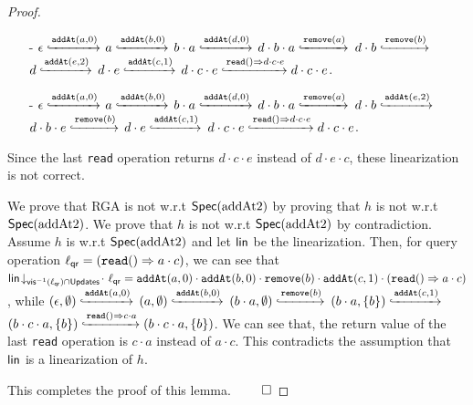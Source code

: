 \begin {proof}
\begin{itemize}
\item[-] $\epsilon \specarrow{\alabelshort[\mathtt{addAt}]{a,0}}$ $a \specarrow{\alabelshort[\mathtt{addAt}]{b,0}}$ $b \cdot a \specarrow{\alabelshort[\mathtt{addAt}]{d,0}}$ $d \cdot b \cdot a \specarrow{\alabelshort[\mathtt{remove}]{a}}$ $d \cdot b \specarrow{\alabelshort[\mathtt{remove}]{b}}$ $d \specarrow{\alabelshort[\mathtt{addAt}]{e,2}}$ $d \cdot e \specarrow{\alabelshort[\mathtt{addAt}]{c,1}}$ $d \cdot c \cdot e \specarrow{\alabellong[\mathtt{read}]{}{d \cdot c \cdot e}{}} d \cdot c \cdot e$. 

\item[-] $\epsilon \specarrow{\alabelshort[\mathtt{addAt}]{a,0}}$ $a \specarrow{\alabelshort[\mathtt{addAt}]{b,0}}$ $b \cdot a \specarrow{\alabelshort[\mathtt{addAt}]{d,0}}$ $d \cdot b \cdot a \specarrow{\alabelshort[\mathtt{remove}]{a}}$ $d \cdot b \specarrow{\alabelshort[\mathtt{addAt}]{e,2}}$ $d \cdot b \cdot e \specarrow{\alabelshort[\mathtt{remove}]{b}}$ $d \cdot e \specarrow{\alabelshort[\mathtt{addAt}]{c,1}}$ $d \cdot c \cdot e \specarrow{\alabellong[\mathtt{read}]{}{d \cdot c \cdot e}{}} d \cdot c \cdot e$.
\end{itemize} 

Since the last {\tt read} operation returns $d \cdot c \cdot e$ instead of $d \cdot e \cdot c$, these linearization is not correct. 

We prove that RGA is not \crdtlinearizable{} w.r.t $\specAddatTwo$ by proving that $h$ is not \crdtlinearizable{} w.r.t $\specAddatTwo$. We prove that $h$ is not \crdtlinearizable{} w.r.t $\specAddatTwo$ by contradiction. Assume $h$ is \crdtlinearizable{} w.r.t $\specAddatTwo$ and let $\alinord$ be the linearization. Then, for query operation $\alabel_{\mathsf{qr}} = (\alabellong[\mathtt{read}]{}{a \cdot c}{})$, we can see that $\alinord\!\downarrow_{\avisord^{-1}(\alabel_{\mathsf{qr}})\cap \updates}\!\cdot\ \alabel_{\mathsf{qr}} = \alabelshort[\mathtt{addAt}]{a,0} \cdot \alabelshort[\mathtt{addAt}]{b,0} \cdot \alabelshort[\mathtt{remove}]{b} \cdot \alabelshort[\mathtt{addAt}]{c,1} \cdot (\alabellong[\mathtt{read}]{}{a \cdot c}{})$, while $(\epsilon,\emptyset) \specarrow{\alabelshort[\mathtt{addAt}]{a,0}}$ $(a,\emptyset) \specarrow{\alabelshort[\mathtt{addAt}]{b,0}}$ $(b \cdot a,\emptyset) \specarrow{\alabelshort[\mathtt{remove}]{b}}$ $(b \cdot a, \{ b \}) \specarrow{\alabelshort[\mathtt{addAt}]{c,1}}$ $(b \cdot c \cdot a, \{ b \}) \specarrow{\alabellong[\mathtt{read}]{}{c \cdot a}{}} (b \cdot c \cdot a, \{ b \})$. We can see that, the return value of the last {\tt read} operation is $c \cdot a$ instead of $a \cdot c$. This contradicts the assumption that $\alinord$ is a linearization of $h$.

This completes the proof of this lemma. $\qed$
\end {proof} 




